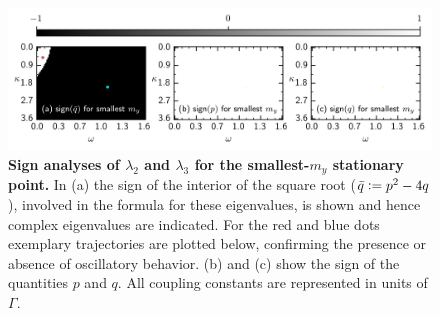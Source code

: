 \begin{figure}[H]
    \includegraphics{pictures/lam2_anal_s2.png}
    \caption{\textbf{Sign analyses of $\lambda_2$ and $\lambda_3$ for the smallest-$m_y$ stationary point.} In (a) the sign of the interior of the square root ($\bar{q}\vcentcolon=p^2-4q$), involved in the formula for these eigenvalues, is shown and hence complex eigenvalues are indicated. For the red and blue dots exemplary trajectories are plotted below, confirming the presence or absence of oscillatory behavior. (b) and (c) show the sign of the quantities $p$ and $q$. All coupling constants are represented in units of $\Gamma$.}%
    \label{fig:sign_lam23_s}
\end{figure}%

